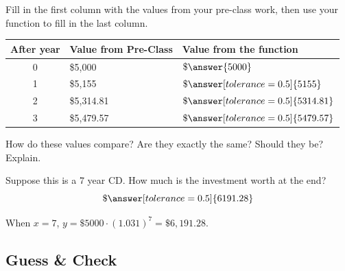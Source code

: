 \documentclass[12pt]{ximera}
\begin{document}
\begin{problem}
Fill in the first column with the values from your pre-class work, then use your
function to fill in the last column.

\begin{center}
\begin{tabular}{|c|l|l|}
\hline
After year & Value from Pre-Class & Value from the function \\
\hline
0 & \$5,000 & $\$\answer{5000}$ \\
\hline
1 & \$5,155 & $\$\answer[tolerance=0.5]{5155}$ \\
\hline
2 & \$5,314.81 & $\$\answer[tolerance=0.5]{5314.81}$ \\
\hline
3 & \$5,479.57 & $\$\answer[tolerance=0.5]{5479.57}$ \\
\hline
\end{tabular}
\end{center}

How do these values compare? Are they exactly the same? Should they be? Explain.

\begin{freeResponse}
\end{freeResponse}
\end{problem}

\begin{problem}
Suppose this is a 7 year CD. How much is the investment worth at the end?
\[
\$\answer[tolerance=0.5]{6191.28}
\]
\begin{solution}
When $x = 7$, $y = \$5000 \cdot (1.031)^{7} = \$6{,}191.28$.
\end{solution}
\end{problem}

\subsection*{Guess \& Check}
\end{document}

